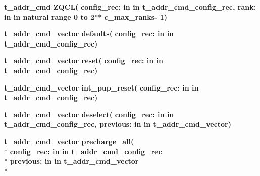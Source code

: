 \begin{DoxyCompactItemize}
\item 
{\bfseries {\bfseries \textcolor{vhdlchar}{t\+\_\+addr\+\_\+cmd}\textcolor{vhdlchar}{ }}} {\bf Z\+Q\+CL}{\bfseries  ( }{\bfseries \textcolor{vhdlchar}{config\+\_\+rec\+: }\textcolor{stringliteral}{in }\textcolor{vhdlchar}{in t\+\_\+addr\+\_\+cmd\+\_\+config\+\_\+rec}}{\bfseries  , \textcolor{vhdlchar}{rank\+: }\textcolor{stringliteral}{in }\textcolor{vhdlchar}{in natural   range  0 to  2$\ast$$\ast$   c\+\_\+max\+\_\+ranks-\/ 1}}{\bfseries  )} 
\item 
{\bfseries {\bfseries \textcolor{vhdlchar}{t\+\_\+addr\+\_\+cmd\+\_\+vector}\textcolor{vhdlchar}{ }}} {\bf defaults}{\bfseries  ( }{\bfseries \textcolor{vhdlchar}{config\+\_\+rec\+: }\textcolor{stringliteral}{in }\textcolor{vhdlchar}{in t\+\_\+addr\+\_\+cmd\+\_\+config\+\_\+rec}}{\bfseries  )} 
\item 
{\bfseries {\bfseries \textcolor{vhdlchar}{t\+\_\+addr\+\_\+cmd\+\_\+vector}\textcolor{vhdlchar}{ }}} {\bf reset}{\bfseries  ( }{\bfseries \textcolor{vhdlchar}{config\+\_\+rec\+: }\textcolor{stringliteral}{in }\textcolor{vhdlchar}{in t\+\_\+addr\+\_\+cmd\+\_\+config\+\_\+rec}}{\bfseries  )} 
\item 
{\bfseries {\bfseries \textcolor{vhdlchar}{t\+\_\+addr\+\_\+cmd\+\_\+vector}\textcolor{vhdlchar}{ }}} {\bf int\+\_\+pup\+\_\+reset}{\bfseries  ( }{\bfseries \textcolor{vhdlchar}{config\+\_\+rec\+: }\textcolor{stringliteral}{in }\textcolor{vhdlchar}{in t\+\_\+addr\+\_\+cmd\+\_\+config\+\_\+rec}}{\bfseries  )} 
\item 
{\bfseries {\bfseries \textcolor{vhdlchar}{t\+\_\+addr\+\_\+cmd\+\_\+vector}\textcolor{vhdlchar}{ }}} {\bf deselect}{\bfseries  ( }{\bfseries \textcolor{vhdlchar}{config\+\_\+rec\+: }\textcolor{stringliteral}{in }\textcolor{vhdlchar}{in t\+\_\+addr\+\_\+cmd\+\_\+config\+\_\+rec}}{\bfseries  , \textcolor{vhdlchar}{previous\+: }\textcolor{stringliteral}{in }\textcolor{vhdlchar}{in t\+\_\+addr\+\_\+cmd\+\_\+vector}}{\bfseries  )} 
\item 
{\bfseries {\bfseries \textcolor{vhdlchar}{t\+\_\+addr\+\_\+cmd\+\_\+vector}\textcolor{vhdlchar}{ }}} {\bf precharge\+\_\+all}{\bfseries  ( }\\*
{\bfseries \textcolor{vhdlchar}{config\+\_\+rec\+: }\textcolor{stringliteral}{in }\textcolor{vhdlchar}{in t\+\_\+addr\+\_\+cmd\+\_\+config\+\_\+rec}}\\*
{\bfseries \textcolor{vhdlchar}{previous\+: }\textcolor{stringliteral}{in }\textcolor{vhdlchar}{in t\+\_\+addr\+\_\+cmd\+\_\+vector}}\\*

\end{DoxyCompactItemize}
